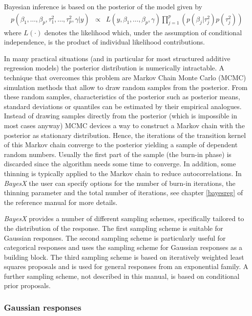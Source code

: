 \documentclass[11pt,a4paper,twoside]{bayesxarticle}
\begin{document}
Bayesian inference is based on the posterior of the model given by
\begin{equation}
\label{posterior}
\begin{array}{lll}
 p(\beta_1,\dots,\beta_p,\tau^2_1,\dots,\tau^2_p,\gamma|y) & \propto & L(y,\beta_1,\dots,\beta_p, \gamma)
\displaystyle \prod_{j=1}^p \left( p(\beta_j|\tau_j^2) p(\tau^2_j)
\right)
 \end{array}
\end{equation}
where  $L(\cdot)$ denotes the likelihood which, under the assumption
of conditional independence, is the product of individual likelihood
contributions.

In many practical situations (and in particular for most structured
additive regression models) the posterior distribution is
numerically intractable. A technique that overcomes this problem are
Markov Chain Monte Carlo (MCMC) simulation methods that allow to
draw random samples from the posterior. From these random samples,
characteristics of the posterior such as posterior means, standard
deviations or quantiles can be estimated by their empirical
analogues. Instead of drawing samples directly from the posterior
(which is impossible in most cases anyway) MCMC devices a way to
construct a Markov chain with the posterior as stationary
distribution. Hence, the iterations of the transition kernel of this
Markov chain converge to the posterior yielding a sample of
dependent random numbers. Usually the first part of the sample (the
burn-in phase) is discarded since the algorithm needs some time to
converge. In addition, some thinning is typically applied to the
Markov chain to reduce autocorrelations. In {\em BayesX} the user
can specify options for the number of burn-in iterations, the
thinning parameter and the total number of iterations, see chapter
\ref*{bayesreg} of the reference manual for more details.

{\em BayesX} provides a number of different sampling schemes,
specifically tailored to the distribution of the response. The first
sampling scheme is suitable for Gaussian responses. The second
sampling scheme is particularly useful for categorical responses and
uses the sampling scheme for Gaussian responses as a building block.
The third sampling scheme is based on iteratively weighted least
squares proposals and is used for general responses from an
exponential family. A further sampling scheme, not described in this
manual, is based on conditional prior proposals.

\subsubsection{Gaussian responses}
\end{document}
